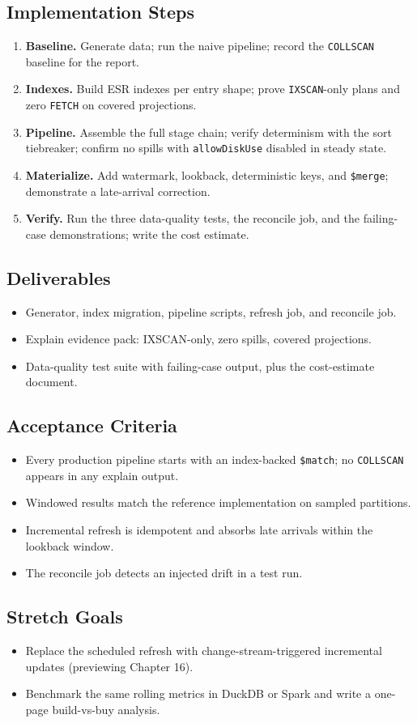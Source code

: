 \subsection*{Implementation Steps}
\begin{enumerate}
    \item \textbf{Baseline.} Generate data; run the naive pipeline; record the \texttt{COLLSCAN} baseline for the report.
    \item \textbf{Indexes.} Build ESR indexes per entry shape; prove \texttt{IXSCAN}-only plans and zero \texttt{FETCH} on covered projections.
    \item \textbf{Pipeline.} Assemble the full stage chain; verify determinism with the sort tiebreaker; confirm no spills with \texttt{allowDiskUse} disabled in steady state.
    \item \textbf{Materialize.} Add watermark, lookback, deterministic keys, and \texttt{\$merge}; demonstrate a late-arrival correction.
    \item \textbf{Verify.} Run the three data-quality tests, the reconcile job, and the failing-case demonstrations; write the cost estimate.
\end{enumerate}

\subsection*{Deliverables}
\begin{itemize}
    \item Generator, index migration, pipeline scripts, refresh job, and reconcile job.
    \item Explain evidence pack: IXSCAN-only, zero spills, covered projections.
    \item Data-quality test suite with failing-case output, plus the cost-estimate document.
\end{itemize}

\subsection*{Acceptance Criteria}
\begin{itemize}
    \item Every production pipeline starts with an index-backed \texttt{\$match}; no \texttt{COLLSCAN} appears in any explain output.
    \item Windowed results match the reference implementation on sampled partitions.
    \item Incremental refresh is idempotent and absorbs late arrivals within the lookback window.
    \item The reconcile job detects an injected drift in a test run.
\end{itemize}

\subsection*{Stretch Goals}
\begin{itemize}
    \item Replace the scheduled refresh with change-stream-triggered incremental updates (previewing Chapter 16).
    \item Benchmark the same rolling metrics in DuckDB or Spark and write a one-page build-vs-buy analysis.
\end{itemize}

